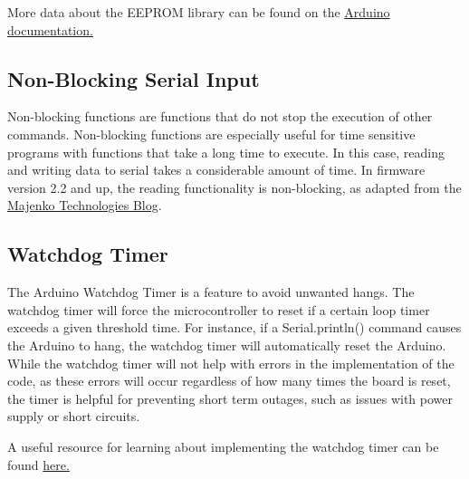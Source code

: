 \documentclass[11pt]{article} %
\begin{document}
More data about the EEPROM library can be found on the \href{https://www.arduino.cc/en/Reference/EEPROM}{Arduino documentation.}

\subsection{Non-Blocking Serial Input}

Non-blocking functions are functions that do not stop the execution of other commands. Non-blocking functions are especially useful for time sensitive programs with functions that take a long time to execute. In this case, reading and writing data to serial takes a considerable amount of time. In firmware version 2.2 and up, the reading functionality is non-blocking, as adapted from the \href{https://hackingmajenkoblog.wordpress.com/2016/02/01/reading-serial-on-the-arduino/}{Majenko Technologies Blog}.


\subsection{Watchdog Timer}

The Arduino Watchdog Timer is a feature to avoid unwanted hangs. The watchdog timer will force the microcontroller to reset if a certain loop timer exceeds a given threshold time. For instance, if a Serial.println() command causes the Arduino to hang, the watchdog timer will automatically reset the Arduino. While the watchdog timer will not help with errors in the implementation of the code, as these errors will occur regardless of how many times the board is reset, the timer is helpful for preventing short term outages, such as issues with power supply or short circuits. 

A useful resource for learning about implementing the watchdog timer can be found \href{https://forum.arduino.cc/index.php?action=dlattach;topic=63651.0;attach=3585}{here.}
\end{document}

